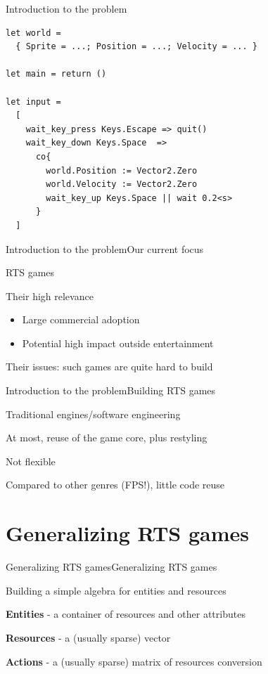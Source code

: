 \documentclass{beamer}
\begin{document}
\begin{frame}[fragile]{Introduction to the problem}
\begin{lstlisting}
let world = 
  { Sprite = ...; Position = ...; Velocity = ... }

let main = return ()

let input = 
  [
    wait_key_press Keys.Escape => quit()
    wait_key_down Keys.Space  =>
      co{
        world.Position := Vector2.Zero
        world.Velocity := Vector2.Zero
        wait_key_up Keys.Space || wait 0.2<s>
      }
  ]
\end{lstlisting}
\end{frame}

\begin{slide}{Introduction to the problem}{Our current focus}{
\item RTS games
\item Their high relevance
\begin{itemize}
\item Large commercial adoption
\item Potential high impact outside entertainment
\end{itemize}
\item Their issues: such games are quite hard to build
}\end{slide}

\begin{slide}{Introduction to the problem}{Building RTS games}{
\item Traditional engines/software engineering
\item At most, reuse of the game core, plus restyling
\item Not flexible
\item Compared to other genres (FPS!), little code reuse
}\end{slide}

\section{Generalizing RTS games}
\begin{slide}{Generalizing RTS games}{Generalizing RTS games}{
\item Building a simple algebra for entities and resources
\item \textbf{Entities} - a container of resources and other attributes
\item \textbf{Resources} - a (usually sparse) vector
\item \textbf{Actions} - a (usually sparse) matrix of resources conversion
}\end{slide}
\end{document}
